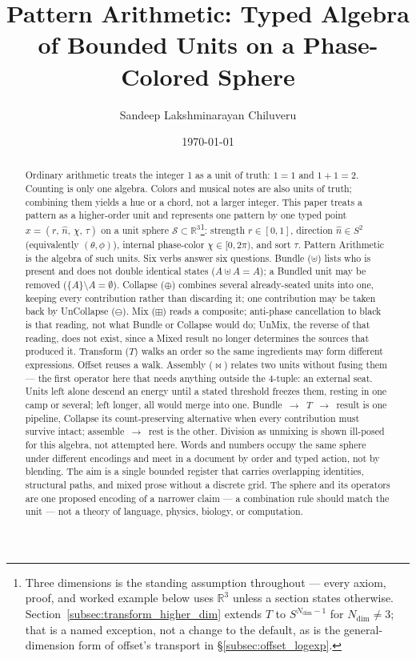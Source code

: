 \documentclass[12pt, a4paper]{article}
\title{Pattern Arithmetic: Typed Algebra of Bounded Units on a Phase-Colored Sphere}
\author{Sandeep Lakshminarayan Chiluveru}
\date{\today}
\begin{document}
\maketitle

\begin{abstract}
Ordinary arithmetic treats the integer 1 as a unit of truth: $1=1$ and $1+1=2$. Counting is only one algebra. Colors and musical notes are also units of truth; combining them yields a hue or a chord, not a larger integer. This paper treats a pattern as a higher-order unit and represents one pattern by one typed point
$x = (r,\,\hat n,\,\chi,\,\tau)$
on a unit sphere $\mathcal{S} \subset \mathbb{R}^3$\footnote{Three
dimensions is the standing assumption throughout --- every axiom,
proof, and worked example below uses $\mathbb{R}^3$ unless a section
states otherwise. Section~\ref{subsec:transform_higher_dim} extends
$T$ to $S^{N_{\mathrm{dim}}-1}$ for $N_{\mathrm{dim}}\ne3$; that is a
named exception, not a change to the default, as is the
general-dimension form of offset's transport in
\S\ref{subsec:offset_logexp}.}:
strength $r \in [0, 1]$,
direction $\hat n \in S^2$ (equivalently $(\theta,\phi)$),
internal phase-color $\chi \in [0, 2\pi)$,
and sort $\tau$.
Pattern Arithmetic is the algebra of such units. Six verbs answer
six questions. Bundle ($\uplus$) lists who is present and does not
double identical states ($A \uplus A = A$); a Bundled unit may be
removed ($\{A\} \setminus A = \emptyset$). Collapse ($\oplus$)
combines several already-seated units into one, keeping every
contribution rather than discarding it; one contribution may be
taken back by UnCollapse ($\ominus$). Mix ($\boxplus$) reads a
composite; anti-phase cancellation to black is that reading, not
what Bundle or Collapse would do; UnMix, the reverse of that reading, does not
exist, since a Mixed result no longer determines the sources that
produced it. Transform ($T$) walks an order so the same ingredients
may form different expressions. Offset reuses a walk. Assembly
($\bowtie$) relates two units without fusing them --- the first
operator here that needs anything outside the 4-tuple: an external
seat. Units left alone descend an energy until a stated threshold
freezes them, resting in one camp or several; left longer, all would
merge into one. Bundle~$\to$~$T$~$\to$~result is
one pipeline, Collapse its count-preserving alternative when every
contribution must survive intact; assemble~$\to$~rest is the other. Division as
unmixing is shown ill-posed for this algebra, not attempted here. Words and numbers occupy the same sphere under different encodings and meet in a document by order and typed action, not by blending. The aim is a single bounded register that carries overlapping identities, structural paths, and mixed prose without a discrete grid. The sphere and its operators are one proposed encoding of a narrower claim --- a combination rule should match the unit --- not a theory of language, physics, biology, or computation.
\end{abstract}
\end{document}
